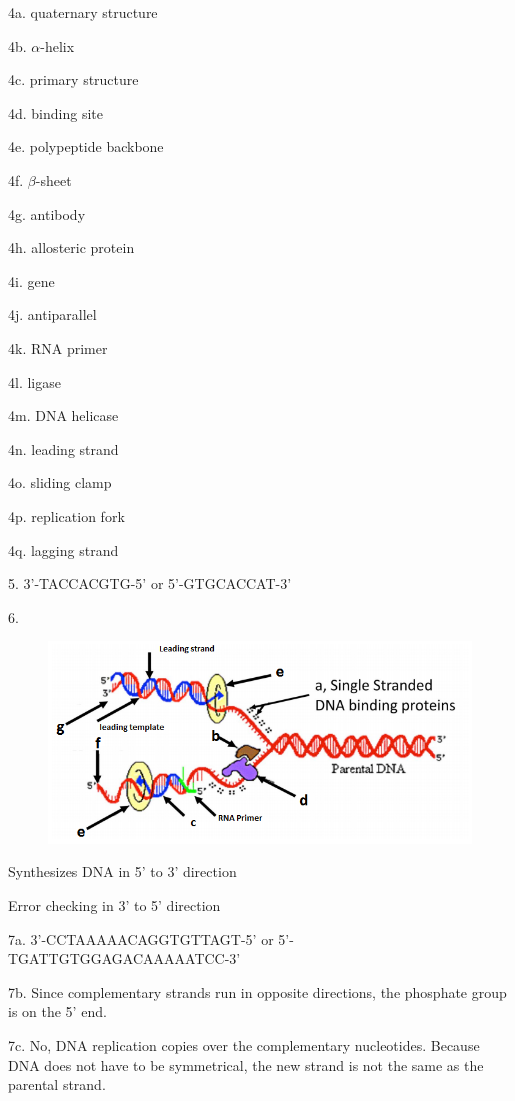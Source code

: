 \documentclass{article}
\begin{document}
4a. quaternary structure

4b. $\alpha$-helix

4c. primary structure

4d. binding site

4e. polypeptide backbone

4f. $\beta$-sheet

4g. antibody

4h. allosteric protein

4i. gene

4j. antiparallel

4k. RNA primer

4l. ligase

4m. DNA helicase

4n. leading strand

4o. sliding clamp

4p. replication fork

4q. lagging strand
\vspace{5mm}

5. 3'-TACCACGTG-5' or 5'-GTGCACCAT-3'
\vspace{5mm}

6. 
\begin{figure}[h]
  \centering
 \includegraphics[scale=0.5]{P6.png}
\end{figure}

Synthesizes DNA in 5' to 3' direction

Error checking in 3' to 5' direction
\vspace{5mm}

7a. 3'-CCTAAAAACAGGTGTTAGT-5' or 5'-TGATTGTGGAGACAAAAATCC-3'

7b. Since complementary strands run in opposite directions, the phosphate group is on the 5' end.

7c. No, DNA replication copies over the complementary nucleotides. Because DNA does not have to be symmetrical, the new strand is not the same as the parental strand.
\vspace{5mm}
\end{document}
